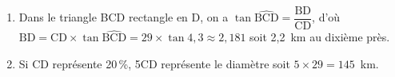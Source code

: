 \begin{enumerate}

	\begin{enumerate}
		\item %
Dans le triangle BCD rectangle en D, on a $\tan \widehat{\text{BCD}} = \dfrac{\text{BD}}{\text{CD}}$, d'où $\text{BD} = \text{CD} \times \tan \widehat{\text{BCD}} = 29 \times \tan 4,3 \approx 2,181$ soit 2,2~km au dixième près.		 
		\item %
Si CD représente 20\,\%, 5CD représente le diamètre soit $5 \times 29 = 145$~km.
	\end{enumerate} 
\end{enumerate} 

\bigskip

